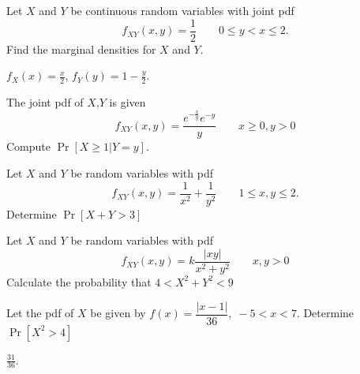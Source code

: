 \documentclass[../main.tex]{subfiles}
\begin{document}
\begin{solution}
\end{solution}
\begin{example}
	Let $X$ and $Y$ be continuous random variables with joint pdf
	$$f_{XY}(x,y) = \dfrac{1}{2} \qquad 0\leq y <x \leq 2.$$
	Find the marginal densities for $X$ and $Y$.
\end{example}
$f_X(x) = \frac x 2$, $f_Y(y) = 1 - \frac y 2$. 
\begin{example}
	The joint pdf of $X$,$Y$ is given
	$$f_{XY}(x,y) = \dfrac{e^{-\frac{x}{y}}e^{-y}}{y}\qquad x\geq 0, y>0$$
	Compute $\Pr[X \geq 1 | Y=y]$.
\end{example}

\begin{example}
	Let $X$ and $Y$ be random variables with pdf $$f_{XY}(x,y) = \dfrac{1}{x^2} + 
	\dfrac{1}{y^2} \qquad 1\leq x,y \leq 2. $$ Determine $\Pr[X+Y>3]$
\end{example}
\begin{example}
	Let $X$ and $Y$ be random variables with pdf 
	$$f_{XY}(x,y) = k \dfrac{|xy|}{x^2+y^2} \qquad x,y > 0$$ Calculate the probability
	that $4 < X^2+Y^2 < 9$
\end{example}
\begin{example}
	Let the pdf of $X$ be given by $f(x) = \dfrac{|x-1|}{36},\;-5<x<7$. Determine
	$\Pr[X^2 > 4]$
\end{example}
\begin{solution}
$\frac{31}{36}$. 
\end{solution}
\end{document}
